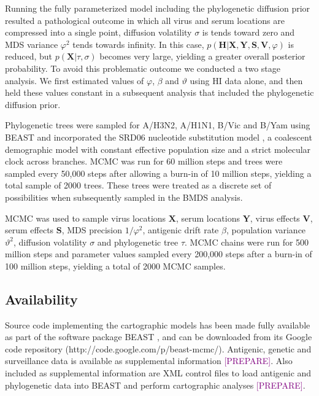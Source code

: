 \documentclass[11pt,oneside,letterpaper]{article}
\newcommand{\mdssd}{\varphi}						%
\newcommand{\diffusionsd}{\sigma}					%
\newcommand{\driftsd}{\vartheta}					%
\newcommand{\tree}{\tau}							%
\def\tbc#1{\textcolor{purple}{[#1]}}
\begin{document}
Running the fully parameterized model including the phylogenetic diffusion prior resulted a pathological outcome in which all virus and serum locations are compressed into a single point, diffusion volatility $\diffusionsd$ is tends toward zero and MDS variance $\mdssd^2$ tends towards infinity.
In this case, $p(\mathbf{H}|\mathbf{X},\mathbf{Y},\mathbf{S},\mathbf{V}, \mdssd)$ is reduced, but $p(\mathbf{X} | \tree, \diffusionsd)$ becomes very large, yielding a greater overall posterior probability.
To avoid this problematic outcome we conducted a two stage analysis.
We first estimated values of $\mdssd$, $\beta$ and $\driftsd$ using HI data alone, and then held these values constant in a subsequent analysis that included the phylogenetic diffusion prior.

Phylogenetic trees were sampled for A/H3N2, A/H1N1, B/Vic and B/Yam using BEAST \cite{BEAST} and incorporated the SRD06 nucleotide substitution model \cite{Shapiro06}, a coalescent demographic model with constant effective population size and a strict molecular clock across branches.
MCMC was run for 60 million steps and trees were sampled every 50,000 steps after allowing a burn-in of 10 million steps, yielding a total sample of 2000 trees.
These trees were treated as a discrete set of possibilities when subsequently sampled in the BMDS analysis.

MCMC was used to sample virus locations $\mathbf{X}$, serum locations $\mathbf{Y}$, virus effects $\mathbf{V}$, serum effects $\mathbf{S}$, MDS precision $1/\mdssd^2$, antigenic drift rate $\beta$, population variance $\driftsd^2$, diffusion volatility $\diffusionsd$ and phylogenetic tree $\tree$.
MCMC chains were run for 500 million steps and parameter values sampled every 200,000 steps after a burn-in of 100 million steps, yielding a total of 2000 MCMC samples.

\subsection*{Availability}

Source code implementing the cartographic models has been made fully available as part of the software package BEAST \cite{BEAST, BEAST17}, and can be downloaded from its Google code repository (http://code.google.com/p/beast-mcmc/).
Antigenic, genetic and surveillance data is available as supplemental information \tbc{PREPARE}.
Also included as supplemental information are XML control files to load antigenic and phylogenetic data into BEAST and perform cartographic analyses \tbc{PREPARE}.
\end{document}
